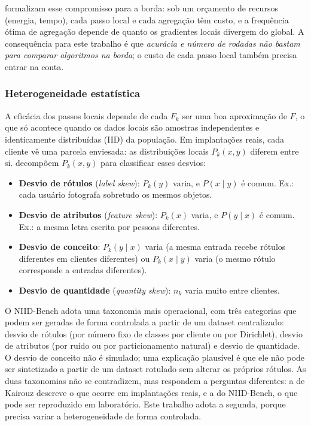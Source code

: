 \citet{wang2019adaptive} formalizam esse compromisso para a borda: sob um orçamento de recursos (energia, tempo), cada passo local e cada agregação têm custo, e a frequência ótima de agregação depende de quanto os gradientes locais divergem do global. A consequência para este trabalho é que \emph{acurácia e número de rodadas não bastam para comparar algoritmos na borda}; o custo de cada passo local também precisa entrar na conta.

\subsubsection{Heterogeneidade estatística}

A eficácia dos passos locais depende de cada $F_k$ ser uma boa aproximação de $F$, o que só acontece quando os dados locais são amostras independentes e identicamente distribuídas (IID) da população. Em implantações reais, cada cliente vê uma parcela enviesada: as distribuições locais $P_k(x,y)$ diferem entre si. \citet{kairouz2021advances} decompõem $P_k(x,y)$ para classificar esses desvios:
\begin{itemize}[leftmargin=*, itemsep=1pt]
    \item \textbf{Desvio de rótulos} (\textit{label skew}): $P_k(y)$ varia, e $P(x\mid y)$ é comum. Ex.: cada usuário fotografa sobretudo os mesmos objetos.
    \item \textbf{Desvio de atributos} (\textit{feature skew}): $P_k(x)$ varia, e $P(y\mid x)$ é comum. Ex.: a mesma letra escrita por pessoas diferentes.
    \item \textbf{Desvio de conceito}: $P_k(y\mid x)$ varia (a mesma entrada recebe rótulos diferentes em clientes diferentes) ou $P_k(x\mid y)$ varia (o mesmo rótulo corresponde a entradas diferentes).
    \item \textbf{Desvio de quantidade} (\textit{quantity skew}): $n_k$ varia muito entre clientes.
\end{itemize}

O NIID-Bench \citep{li2022niidbench} adota uma taxonomia mais operacional, com três categorias que podem ser geradas de forma controlada a partir de um dataset centralizado: desvio de rótulos (por número fixo de classes por cliente ou por Dirichlet), desvio de atributos (por ruído ou por particionamento natural) e desvio de quantidade. O desvio de conceito não é simulado; uma explicação plausível é que ele não pode ser sintetizado a partir de um dataset rotulado sem alterar os próprios rótulos. As duas taxonomias não se contradizem, mas respondem a perguntas diferentes: a de Kairouz descreve o que ocorre em implantações reais, e a do NIID-Bench, o que pode ser reproduzido em laboratório. Este trabalho adota a segunda, porque precisa variar a heterogeneidade de forma controlada.

